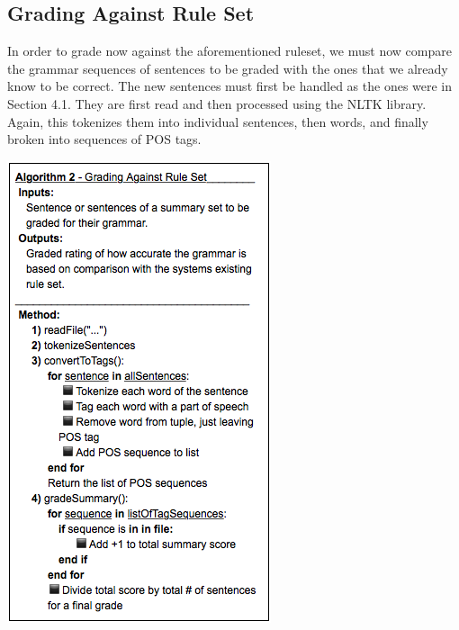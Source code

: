 \documentclass[11pt,a4paper]{article}
\newenvironment{Figure}
  {\par\medskip\noindent\minipage{\linewidth}}
  {\endminipage\par\medskip}
\begin{document}
\begin{multicols}{2}
\subsection{Grading Against Rule Set}
In order to grade now against the aforementioned ruleset, we must now compare the grammar sequences of sentences to be graded with the ones that we already know to be correct. The new sentences must first be handled as the ones were in Section 4.1. They are first read and then processed using the NLTK library. Again, this tokenizes them into individual sentences, then words, and finally broken into sequences of POS tags.

\begin{Figure}  
   \centering
   \includegraphics[width=\linewidth]{GradeAlgorithm}
\end{Figure} 


\end{multicols}
\end{document}
